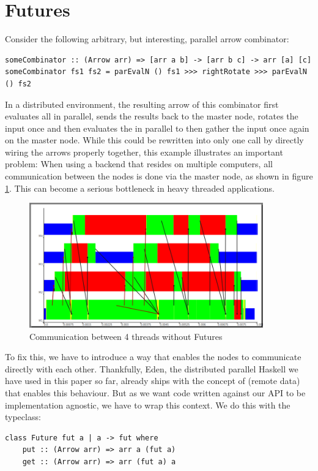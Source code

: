 \section{Futures}
Consider the following arbitrary, but interesting, parallel arrow combinator:
\begin{lstlisting}[frame=htrbl]
someCombinator :: (Arrow arr) => [arr a b] -> [arr b c] -> arr [a] [c]
someCombinator fs1 fs2 = parEvalN () fs1 >>> rightRotate >>> parEvalN () fs2
\end{lstlisting}
In a distributed environment, the resulting arrow of this combinator first evaluates all \code{[arr a b]} in parallel, sends the results back to the master node, rotates the input once and then evaluates the \code{[arr b c]} in parallel to then gather the input once again on the master node. While this could be rewritten into only one  call by directly wiring the arrows properly together, this example illustrates an important problem: When using a  backend that resides on multiple computers, all communication between the nodes is done via the master node, as shown in figure \ref{fig:withoutFutures}. This can become a serious bottleneck in heavy threaded applications.
\begin{figure}[ht]
	\centering
	\includegraphics[width=0.9\textwidth]{images/withoutFutures}
	\caption[without Futures]{Communication between 4 threads without Futures}
	\label{fig:withoutFutures}
\end{figure}
To fix this, we have to introduce a way that enables the nodes to communicate directly with each other. Thankfully, Eden, the distributed parallel Haskell we have used in this paper so far, already ships with the concept of  (remote data) that enables this behaviour. But as we want code written against our API to be implementation agnostic, we have to wrap this context. We do this with the  typeclass:
\begin{lstlisting}[frame=htrbl]
class Future fut a | a -> fut where
    put :: (Arrow arr) => arr a (fut a)
    get :: (Arrow arr) => arr (fut a) a
\end{lstlisting}
